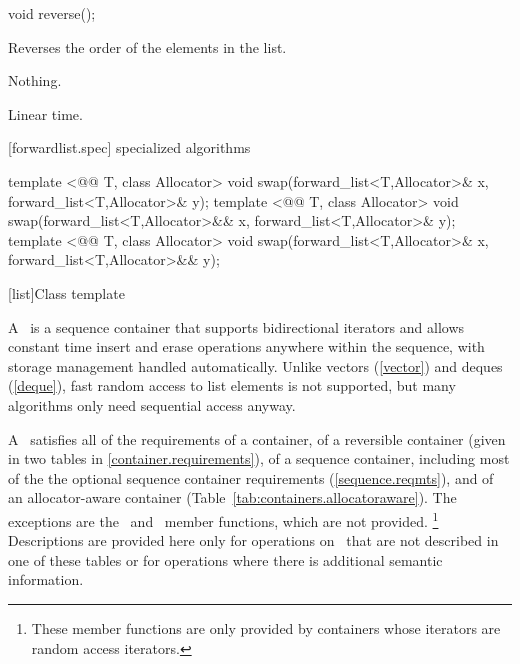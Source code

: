 \documentclass[american,twoside]{book}
\begin{document}
\begin{itemdecl}
void reverse();
\end{itemdecl}

\begin{itemdescr}
\pnum
\effects Reverses the order of the elements in the list.

\pnum
\throws Nothing.

\pnum
\complexity Linear time.
\end{itemdescr}

[forwardlist.spec]{ specialized algorithms}

\begin{itemdecl}
template <@@ T, class Allocator>
  void swap(forward_list<T,Allocator>& x, forward_list<T,Allocator>& y);
template <@@ T, class Allocator>
  void swap(forward_list<T,Allocator>&& x, forward_list<T,Allocator>& y);
template <@@ T, class Allocator>
  void swap(forward_list<T,Allocator>& x, forward_list<T,Allocator>&& y);
\end{itemdecl}

\begin{itemdescr}
\pnum
\effects {}
\end{itemdescr}

[list]{Class template }

\pnum
{}%
A
\
is a sequence container that supports
bidirectional iterators and allows constant time insert and erase
operations anywhere within the sequence, with storage management handled
automatically. Unlike vectors (\ref{vector}) and deques (\ref{deque}),
fast random access to list elements is not supported, but many
algorithms only need sequential access anyway.

\pnum
A \ satisfies all of the requirements of a container, of
a reversible container (given in two tables in
\ref{container.requirements}), of a sequence container,
including most of the the optional sequence container
requirements (\ref{sequence.reqmts}), and of an allocator-aware container (Table~\ref{tab:containers.allocatoraware}).
The exceptions are the
\
and
\
member functions, which are not provided.%
\footnote{
These member functions are only provided by containers whose iterators
are random access iterators.
}
Descriptions are provided here only for operations on
\tcode{list}\
that are not described in one of these tables
or for operations where there is additional semantic information.
\end{document}
